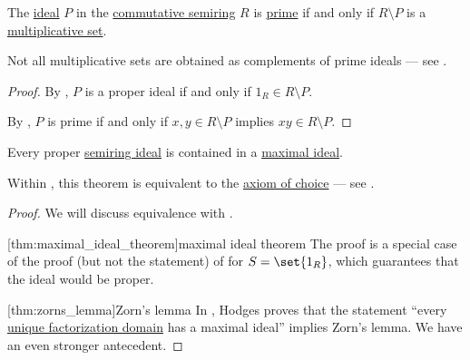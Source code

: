 \begin{proposition}\label{thm:complement_of_prime_ideal}
  The \hyperref[def:semiring_ideal]{ideal} \( P \) in the \hyperref[def:semiring/commutative]{commutative semiring} \( R \) is \hyperref[def:semiring_ideal/prime]{prime} if and only if \( R \setminus P \) is a \hyperref[def:multiplicative_set_in_semiring]{multiplicative set}.

  Not all multiplicative sets are obtained as complements of prime ideals --- see .
\end{proposition}
\begin{proof}
  By , \( P \) is a proper ideal if and only if \( 1_R \in R \setminus P \).

  By , \( P \) is prime if and only if \( x, y \in R \setminus P \) implies \( xy \in R \setminus P \).
\end{proof}

\begin{theorem}\label{thm:maximal_ideal_theorem}
  Every proper \hyperref[def:semiring_ideal]{semiring ideal} is contained in a \hyperref[def:semiring_ideal/maximal]{maximal ideal}.

  Within \hyperref[def:zfc]{}, this theorem is equivalent to the \hyperref[def:zfc/choice]{axiom of choice} --- see .
\end{theorem}
\begin{proof}
  We will discuss equivalence with .

  [thm:maximal_ideal_theorem]{maximal ideal theorem} The proof is a special case of the proof (but not the statement) of  for \( S = \set{ 1_R } \), which guarantees that the ideal would be proper.

  [thm:zorns_lemma]{Zorn's lemma} In \cite{Hodges1979}, Hodges proves that the statement \enquote{every \hyperref[def:unique_factorization_domain]{unique factorization domain} has a maximal ideal} implies Zorn's lemma. We have an even stronger antecedent.
\end{proof}

